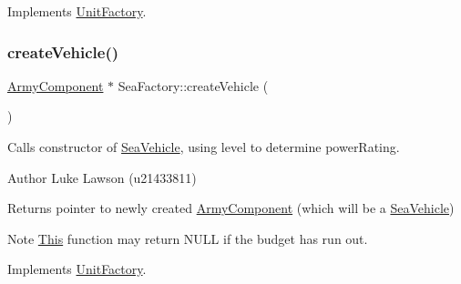 Implements \mbox{\hyperlink{class_unit_factory_a6f6dda71c85c3f44e09353b63d7c8fb5}{Unit\+Factory}}.

\mbox{\label{class_sea_factory_a0914bdb14680e6b0c8292ba6f6d13b54}} 
\subsubsection{\texorpdfstring{createVehicle()}{createVehicle()}}
{\footnotesize\ttfamily \mbox{\hyperlink{class_army_component}{Army\+Component}} $\ast$ Sea\+Factory\+::create\+Vehicle (\begin{DoxyParamCaption}{ }\end{DoxyParamCaption})\hspace{0.3cm}{\ttfamily [virtual]}}



Calls constructor of \mbox{\hyperlink{class_sea_vehicle}{Sea\+Vehicle}}, using level to determine power\+Rating. 

\begin{DoxyAuthor}{Author}
Luke Lawson (u21433811) 
\end{DoxyAuthor}
\begin{DoxyReturn}{Returns}
pointer to newly created \mbox{\hyperlink{class_army_component}{Army\+Component}} (which will be a \mbox{\hyperlink{class_sea_vehicle}{Sea\+Vehicle}}) 
\end{DoxyReturn}
\begin{DoxyNote}{Note}
\mbox{\hyperlink{class_this}{This}} function may return N\+U\+LL if the budget has run out. 
\end{DoxyNote}


Implements \mbox{\hyperlink{class_unit_factory_a465dd9ec1883939eb27274164e967822}{Unit\+Factory}}.

